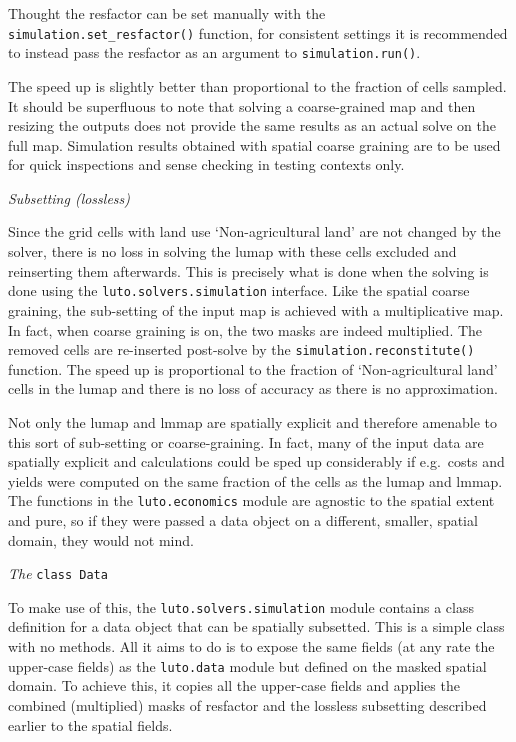 \documentclass[12pt,a4paper,twoside]{article}
\begin{document}
Thought the resfactor can be set manually with the \texttt{simulation.set_resfactor()} function, for consistent settings it is recommended to instead pass the resfactor as an argument to \texttt{simulation.run()}.

The speed up is slightly better than proportional to the fraction of cells sampled. It should be superfluous to note that solving a coarse-grained map and then resizing the outputs does not provide the same results as an actual solve on the full map. Simulation results obtained with spatial coarse graining are to be used for quick inspections and sense checking in testing contexts only.

\emph{Subsetting (lossless)}

Since the grid cells with land use `Non-agricultural land' are not changed by the solver, there is no loss in solving the lumap with these cells excluded and reinserting them afterwards. This is precisely what is done when the solving is done using the \texttt{luto.solvers.simulation} interface. Like the spatial coarse graining, the sub-setting of the input map is achieved with a multiplicative map. In fact, when coarse graining is on, the two masks are indeed multiplied. The removed cells are re-inserted post-solve by the \texttt{simulation.reconstitute()} function. The speed up is proportional to the fraction of `Non-agricultural land' cells in the lumap and there is no loss of accuracy as there is no approximation.

Not only the lumap and lmmap are spatially explicit and therefore amenable to this sort of sub-setting or coarse-graining. In fact, many of the input data are spatially explicit and calculations could be sped up considerably if e.g.\ costs and yields were computed on the same fraction of the cells as the lumap and lmmap. The functions in the \texttt{luto.economics} module are agnostic to the spatial extent and pure, so if they were passed a data object on a different, smaller, spatial domain, they would not mind.

\emph{The} \texttt{class Data}

To make use of this, the \texttt{luto.solvers.simulation} module contains a class definition for a data object that can be spatially subsetted. This is a simple class with no methods. All it aims to do is to expose the same fields (at any rate the upper-case fields) as the \texttt{luto.data} module but defined on the masked spatial domain. To achieve this, it copies all the upper-case fields and applies the combined (multiplied) masks of resfactor and the lossless subsetting described earlier to the spatial fields.
\end{document}
